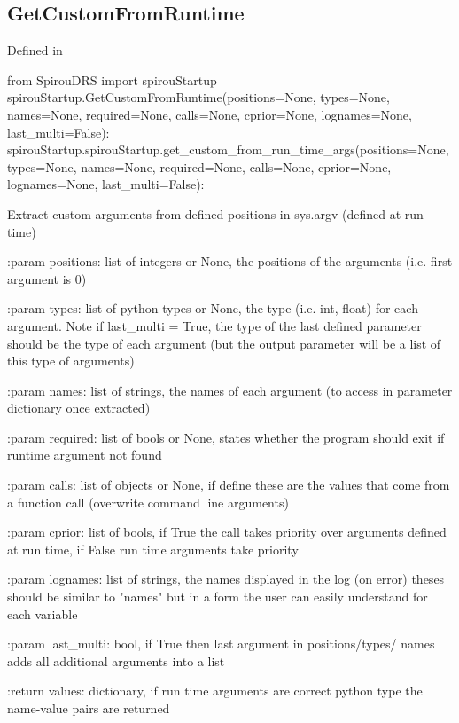 \noindent\begin{minipage}{\textwidth}
\subsection{GetCustomFromRuntime}

Defined in \spirouStartup{}

\begin{pythonbox}
from SpirouDRS import spirouStartup
spirouStartup.GetCustomFromRuntime(positions=None, types=None, names=None,
                                   required=None, calls=None, cprior=None,
                                   lognames=None, last_multi=False):
spirouStartup.spirouStartup.get_custom_from_run_time_args(positions=None, types=None, names=None,
                                   required=None, calls=None, cprior=None,
                                   lognames=None, last_multi=False):
\end{pythonbox}

\begin{pythondocstring}
Extract custom arguments from defined positions in sys.argv (defined at
run time)

:param positions: list of integers or None, the positions of the arguments
                  (i.e. first argument is 0)

:param types: list of python types or None, the type (i.e. int, float) for
              each argument. Note if last_multi = True, the type of the
              last defined parameter should be the type of each argument
              (but the output parameter will be a list of this type of
              arguments)

:param names: list of strings, the names of each argument (to access in
              parameter dictionary once extracted)

:param required: list of bools or None, states whether the program
                 should exit if runtime argument not found

:param calls: list of objects or None, if define these are the values that
              come from a function call (overwrite command line arguments)

:param cprior: list of bools, if True the call takes priority over arguments
               defined at run time, if False run time arguments take
               priority

:param lognames: list of strings, the names displayed in the log (on error)
                 theses should be similar to "names" but in a form the
                 user can easily understand for each variable

:param last_multi: bool, if True then last argument in positions/types/
                   names adds all additional arguments into a list

:return values: dictionary, if run time arguments are correct python type
                the name-value pairs are returned
\end{pythondocstring}
\end{minipage}

